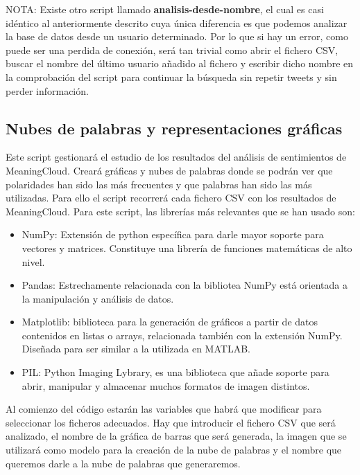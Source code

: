 NOTA: Existe otro script llamado \textbf{analisis-desde-nombre}, el cual es casi idéntico al anteriormente descrito cuya única diferencia es que podemos analizar la base de datos desde un usuario determinado. Por lo que si hay un error, como puede ser una perdida de conexión, será tan trivial como abrir el fichero CSV, buscar el nombre del último usuario añadido al fichero y escribir dicho nombre en la comprobación del script para continuar la búsqueda sin repetir tweets y sin perder información. 



\subsection{Nubes de palabras y representaciones gráficas}

Este script gestionará el estudio de los resultados del análisis de sentimientos de MeaningCloud. Creará gráficas y nubes de palabras donde se podrán ver que polaridades han sido las más frecuentes y que palabras han sido las más utilizadas. Para ello el script recorrerá cada fichero CSV con los resultados de MeaningCloud. Para este script, las librerías más relevantes que se han usado son: 


\begin{itemize}
	\item NumPy\cite{Numpy}: Extensión de python específica para darle mayor soporte para vectores y matrices. Constituye una librería de funciones matemáticas de alto nivel.
	\item Pandas\cite{Pandas}: Estrechamente relacionada con la bibliotea NumPy está orientada a la manipulación y análisis de datos. 	
	\item Matplotlib\cite{Hunter:2007}: biblioteca para la generación de gráficos a partir de datos contenidos en listas o arrays, relacionada también con la extensión NumPy. Diseñada para ser similar a la utilizada en MATLAB.
	\item PIL\cite{Pillow}: Python Imaging Lybrary, es una biblioteca que añade soporte para abrir, manipular y almacenar muchos formatos de imagen distintos. 
	
\end{itemize}


Al comienzo del código estarán las variables que habrá que modificar para seleccionar los ficheros adecuados. Hay que introducir el fichero CSV que será analizado, el nombre de la gráfica de barras que será generada, la imagen que se utilizará como modelo para la creación de la nube de palabras y el nombre que queremos darle a la nube de palabras que generaremos. 

